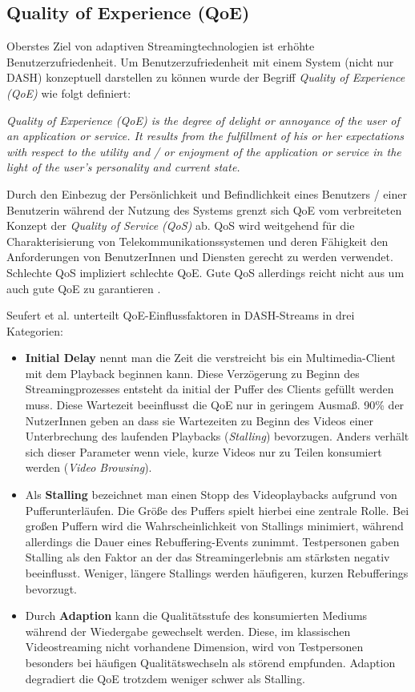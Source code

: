 \documentclass[paper = a4, fontsize = 12pt, parskip = half]{scrartcl} %
\begin{document}
\subsection{Quality of Experience (QoE)}
Oberstes Ziel von adaptiven Streamingtechnologien ist erhöhte Benutzerzufriedenheit. Um Benutzerzufriedenheit mit einem System (nicht nur DASH) konzeptuell darstellen zu können wurde der Begriff \textit{Quality of Experience (QoE)} wie folgt definiert:

\glqq \textit{Quality of Experience (QoE) is the degree of delight or annoyance of the user of an application or service. It results from the fulfillment of his or her expectations with respect to the utility and / or enjoyment of the application or service in the light of the user’s personality and current state.}\grqq \cite{brunnstrom_qualinet_2013}

Durch den Einbezug der Persönlichkeit und Befindlichkeit eines Benutzers / einer Benutzerin während der Nutzung des Systems grenzt sich QoE vom verbreiteten Konzept der \textit{Quality of Service (QoS)} ab. QoS wird weitgehend für die Charakterisierung von Telekommunikationssystemen und deren Fähigkeit den Anforderungen von BenutzerInnen und Diensten gerecht zu werden verwendet. Schlechte QoS impliziert schlechte QoE. Gute QoS allerdings reicht nicht aus um auch gute QoE zu garantieren \cite{brunnstrom_qualinet_2013}.

Seufert et al. \cite{seufert_survey_2015} unterteilt QoE-Einflussfaktoren in DASH-Streams in drei Kategorien:
\begin{itemize}
	\item \textbf{Initial Delay} nennt man die Zeit die verstreicht bis ein Multimedia-Client mit dem Playback beginnen kann. Diese Verzögerung zu Beginn des Streamingprozesses entsteht da initial der Puffer des Clients gefüllt werden muss. Diese Wartezeit beeinflusst die QoE nur in geringem Ausmaß. 90\% der NutzerInnen geben an dass sie Wartezeiten zu Beginn des Videos einer Unterbrechung des laufenden Playbacks (\textit{Stalling}) bevorzugen. Anders verhält sich dieser Parameter wenn viele, kurze Videos nur zu Teilen konsumiert werden (\textit{Video Browsing}).
	\item Als \textbf{Stalling} bezeichnet man einen Stopp des Videoplaybacks aufgrund von Pufferunterläufen. Die Größe des Puffers spielt hierbei eine zentrale Rolle. Bei großen Puffern wird die Wahrscheinlichkeit von Stallings minimiert, während allerdings die Dauer eines Rebuffering-Events zunimmt. Testpersonen gaben Stalling als den Faktor an der das Streamingerlebnis am stärksten negativ beeinflusst. Weniger, längere Stallings werden häufigeren, kurzen Rebufferings bevorzugt.
	\item Durch \textbf{Adaption} kann die Qualitätsstufe des konsumierten Mediums während der Wiedergabe gewechselt werden. Diese, im klassischen Videostreaming nicht vorhandene Dimension, wird von Testpersonen besonders bei häufigen Qualitätswechseln als störend empfunden. Adaption degradiert die QoE trotzdem weniger schwer als Stalling.
\end{itemize}
\end{document}
